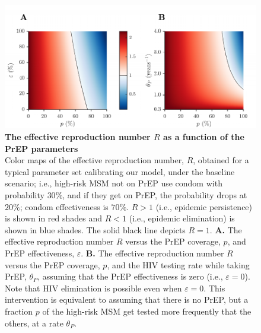 \documentclass[12pt]{article}
\begin{document}
\newpage
\begin{figure}[H]
	\centering
	\includegraphics{Figures/Fig_S3}
	\caption[The effective reproduction number $R$ as a function of the PrEP parameters]{%
		\textbf{The effective reproduction number $R$ as a function of the PrEP parameters}\\
	Color maps of the effective reproduction number, $R$, obtained for a typical parameter set calibrating our model, under the baseline scenario; i.e., high-risk MSM not on PrEP use condom with probability $30\%$, and if they get on PrEP, the probability drops at $20\%$; condom effectiveness is $70\%$. $R>1$ (i.e., epidemic persistence) is shown in red shades and $R<1$ (i.e., epidemic elimination) is shown in blue shades. The solid black line depicts $R=1$. \textbf{A.}  The effective reproduction number $R$ versus the PrEP coverage, $p$, and PrEP effectiveness, $\varepsilon$. \textbf{B.} The effective reproduction number $R$ versus the PrEP coverage, $p$, and the HIV testing rate while taking PrEP, $\theta_P$, assuming that the PrEP effectiveness is zero (i.e., $\varepsilon=0$). Note that HIV elimination is possible even when $\varepsilon=0$. This intervention is equivalent to assuming that there is no PrEP, but a fraction $p$ of the high-risk MSM get tested more frequently that the others, at a rate $\theta_P$.}
	\label{fig:R}
\end{figure}
\end{document}
